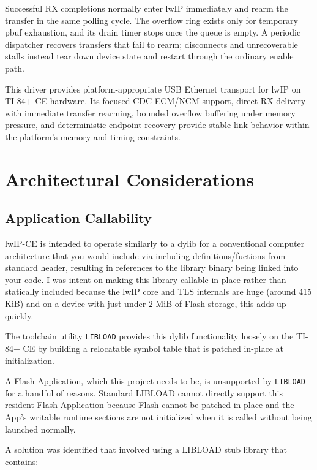 \documentclass[titlepage]{report}
\begin{document}
		Successful RX completions normally enter lwIP immediately and rearm the transfer in the same polling cycle. The overflow ring exists only for temporary pbuf exhaustion, and its drain timer stops once the queue is empty. A periodic dispatcher recovers transfers that fail to rearm; disconnects and unrecoverable stalls instead tear down device state and restart through the ordinary enable path.
		
		This driver provides platform-appropriate USB Ethernet transport for lwIP on TI-84+ CE hardware. Its focused CDC ECM/NCM support, direct RX delivery with immediate transfer rearming, bounded overflow buffering under memory pressure, and deterministic endpoint recovery provide stable link behavior within the platform's memory and timing constraints.
	
	\section{Architectural Considerations}

	\subsection{Application Callability}
	\label{ssec:application_callability}

		lwIP-CE is intended to operate similarly to a dylib for a conventional computer architecture that you would include via including definitions/fuctions from standard header, resulting in references to the library binary being linked into your code. I was intent on making this library callable in place rather than statically included because the lwIP core and TLS internals are huge (around 415 KiB) and on a device with just under 2 MiB of Flash storage, this adds up quickly.

		The toolchain utility \texttt{LIBLOAD} provides this dylib functionality loosely on the TI-84+ CE by building a relocatable symbol table that is patched in-place at initialization.

		A Flash Application, which this project needs to be, is unsupported by \texttt{LIBLOAD} for a handful of reasons. Standard LIBLOAD cannot directly support this resident Flash Application because Flash cannot be patched in place and the App’s writable runtime sections are not initialized when it is called without being launched normally.

		A solution was identified that involved using a LIBLOAD stub library that contains:
		
\end{document}
